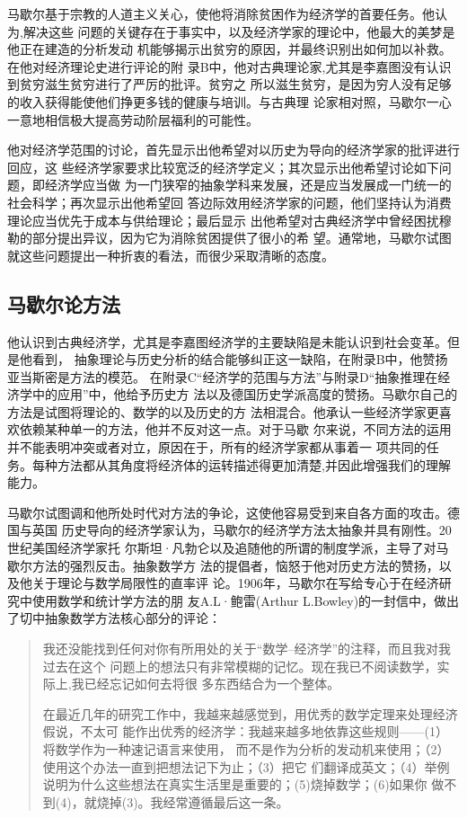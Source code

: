 马歇尔基于宗教的人道主义关心，使他将消除贫困作为经济学的首要任务。他认为,解决这些
问题的关键存在于事实中，以及经济学家的理论中，他最大的美梦是他正在建造的分析发动
机能够揭示出贫穷的原因，并最终识别出如何加以补救。在他对经济理论史进行评论的附
录B中，他对古典理论家,尤其是李嘉图没有认识到贫穷滋生贫穷进行了严厉的批评。贫穷之
所以滋生贫穷，是因为穷人没有足够的收入获得能使他们挣更多钱的健康与培训。与古典理
论家相对照，马歇尔一心一意地相信极大提高劳动阶层福利的可能性。

他对经济学范围的讨论，首先显示出他希望对以历史为导向的经济学家的批评进行回应，这
些经济学家要求比较宽泛的经济学定义；其次显示出他希望讨论如下问题，即经济学应当做
为一门狭窄的抽象学科来发展，还是应当发展成一门统一的社会科学；再次显示出他希望回
答边际效用经济学家的问题，他们坚持认为消费理论应当优先于成本与供给理论；最后显示
出他希望对古典经济学中曾经困扰穆勒的部分提出异议，因为它为消除贫困提供了很小的希
望。通常地，马歇尔试图就这些问题提出一种折衷的看法，而很少采取清晰的态度。

\subsection{马歇尔论方法}

他认识到古典经济学，尤其是李嘉图经济学的主要缺陷是未能认识到社会变革。但是他看到，
抽象理论与历史分析的结合能够纠正这一缺陷，在附录B中，他赞扬亚当斯密是方法的模范。
在附录C“经济学的范围与方法”与附录D“抽象推理在经济学中的应用”中，他给予历史方
法以及德国历史学派高度的赞扬。马歇尔自己的方法是试图将理论的、数学的以及历史的方
法相混合。他承认一些经济学家更喜欢依赖某种单一的方法，他并不反对这一点。对于马歇
尔来说，不同方法的运用并不能表明冲突或者对立，原因在于，所有的经济学家都从事着一
项共同的任务。每种方法都从其角度将经济体的运转描述得更加清楚,并因此增强我们的理解
能力。

马歇尔试图调和他所处时代对方法的争论，这使他容易受到来自各方面的攻击。德国与英国
历史导向的经济学家认为，马歇尔的经济学方法太抽象并具有刚性。20世纪美国经济学家托
尔斯坦·凡勃仑以及追随他的所谓的制度学派，主导了对马歇尔方法的强烈反击。抽象数学方
法的提倡者，恼怒于他对历史方法的赞扬，以及他关于理论与数学局限性的直率评
论。1906年，马歇尔在写给专心于在经济研究中使用数学和统计学方法的朋
友A.L·鲍雷(Arthur L.Bowley)的一封信中，做出了切中抽象数学方法核心部分的评论：
\begin{quotation}
  我还没能找到任何对你有所用处的关于“数学--经济学”的注释，而且我对我过去在这个
  问题上的想法只有非常模糊的记忆。现在我已不阅读数学，实际上,我已经忘记如何去将很
  多东西结合为一个整体。

  在最近几年的研究工作中，我越来越感觉到，用优秀的数学定理来处理经济假说，不太可
  能作出优秀的经济学：我越来越多地依靠这些规则——(1）将数学作为一种速记语言来使用，
  而不是作为分析的发动机来使用；（2）使用这个办法一直到把想法记下为止；（3）把它
  们翻译成英文；（4）举例说明为什么这些想法在真实生活里是重要的；(5)烧掉数学；(6)如果你
  做不到(4)，就烧掉(3)。我经常遵循最后这一条。
\end{quotation}

